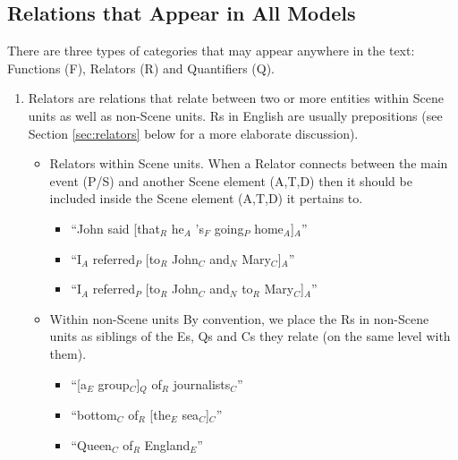 \documentclass[11pt]{article}
\newcommand{\dcom}[1]{\textit{\color{blue}{#1}}}
\begin{document}
\subsection*{Relations that Appear in All Models}

There are three types of categories that may appear anywhere in the text: Functions (F), Relators (R) and Quantifiers (Q).


\begin{enumerate}

\item 
Relators are relations that relate between two or more entities within Scene units as well as non-Scene units. Rs in English are usually prepositions (see Section \ref{sec:relators} below for a more elaborate discussion).  

\begin{itemize}
    \item
Relators within Scene units.
When a Relator connects between the main event (P/S) and another Scene element (A,T,D) then it should be included inside the Scene element (A,T,D) it pertains to.

\begin{itemize}
    \item
      ``John said [that$_R$ he$_A$ 's$_F$ going$_P$ home$_A$]$_A$'' 
    \item
      ``I$_A$ referred$_P$ [to$_R$ John$_C$ and$_N$ Mary$_C$]$_A$''
    \item
      ``I$_A$ referred$_P$ [to$_R$ John$_C$ and$_N$ to$_R$ Mary$_C$]$_A$'' 
\end{itemize}
 
    \item
Within non-Scene units
By convention, we place the Rs in non-Scene units as siblings of the Es, Qs and Cs they relate (on the same level with them). 

\begin{itemize}
    \item
	  ``[a$_E$ group$_C$]$_Q$ of$_R$ journalists$_C$''
	\item
      ``bottom$_C$ of$_R$ [the$_E$ sea$_C$]$_C$''
    \item
      ``Queen$_C$ of$_R$ England$_E$''
  \end{itemize}
  

\end{itemize}
\end{enumerate}
\end{document}
